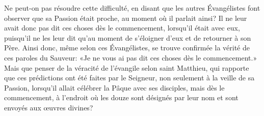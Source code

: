 Ne peut-on pas résoudre cette difficulté,
	en disant que les autres Évangélistes font observer
		que sa Passion était proche,
	au moment où il parlait ainsi?
Il ne leur avait donc pas dit ces choses dès le commencement,
	lorsqu’il était avec eux,
	puisqu’il ne les leur dit qu’au moment de s’éloigner d’eux
		et de retourner à son Père.
Ainsi donc, même selon ces Évangélistes,
	se trouve confirmée la vérité de ces paroles du Sauveur:
	«Je ne vous ai pas dit ces choses dès le commencement.»
Mais que penser de la véracité de l’évangile selon saint Matthieu,
	qui rapporte que ces prédictions ont été faites par le Seigneur,
	non seulement à la veille de sa Passion,
	lorsqu’il allait célébrer la Pâque avec ses disciples,
	mais dès le commencement,
	à l’endroit où les douze sont désignés par leur nom
	et sont envoyés aux œuvres divines?
